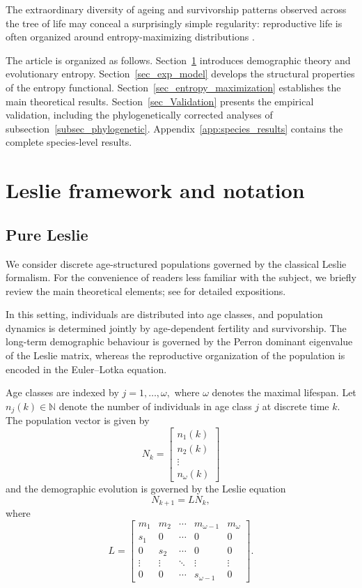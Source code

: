 \documentclass[10pt,a4paper]{amsart}
\theoremstyle{definition}
\theoremstyle{remark}
\numberwithin{equation}{section}
\begin{document}
The extraordinary diversity of ageing and survivorship
patterns observed across the tree of life
\cite{BuescuOliveiraSousa2023,Jones2014,Baudisch2008,deVries2023}
may conceal a surprisingly simple regularity:
reproductive life is often organized around
entropy-maximizing distributions
\cite{Demetrius78,Demetrius2004}.

The article is organized as follows.
Section~\ref{sec_Leslie} introduces  demographic theory and
evolutionary entropy.
Section~\ref{sec_exp_model} develops the structural properties of the
entropy functional.
Section~\ref{sec_entropy_maximization} establishes the main
theoretical results.
Section~\ref{sec_Validation} presents the empirical validation,
including the phylogenetically corrected analyses of
subsection~\ref{subsec_phylogenetic}.
Appendix~\ref{app:species_results} contains the complete species-level results.





\section{Leslie framework and notation}
\label{sec_Leslie}
\subsection{Pure Leslie}

We consider discrete age-structured populations governed by the
classical Leslie formalism. For the convenience of readers less
familiar with the subject, we briefly review the main theoretical elements; see
\cite{Leslie1945,Keyfitz1968,Cus,ElaydiCushing2024,Charlesworth}
for detailed expositions.

In this setting, individuals are distributed into age classes, and
population dynamics is determined jointly by age-dependent fertility
and survivorship.
The long-term demographic behaviour is governed by the Perron
dominant eigenvalue of the Leslie matrix,
whereas the reproductive organization of the population is encoded
in the Euler--Lotka equation.

Age classes are indexed by
$
j=1,\dots,\omega,
$
where \(\omega\) denotes the maximal lifespan.
Let
$
n_j(k)\in\mathbb N
$
denote the number of individuals in age class \(j\) at discrete time
\(k\).
The population vector is given by
\[
N_k=
\begin{bmatrix}
n_1(k)\\
n_2(k)\\
\vdots\\
n_\omega(k)
\end{bmatrix}
\]
and the demographic evolution is governed by the Leslie equation
\[
N_{k+1}=LN_k,
\]
where
\[
L=
\begin{bmatrix}
m_1 & m_2 & \cdots & m_{\omega-1} & m_\omega\\
s_1 & 0 & \cdots & 0 & 0\\
0 & s_2 & \cdots & 0 & 0\\
\vdots & \vdots & \ddots & \vdots & \vdots\\
0 & 0 & \cdots & s_{\omega-1} & 0
\end{bmatrix}.
\]
\end{document}
